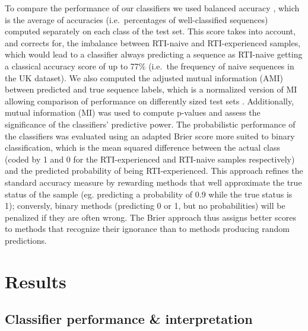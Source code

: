 \documentclass[
  11,
]{scrbook}
\begin{document}
To compare the performance of our classifiers we used balanced accuracy
\autocite{brodersenBalancedAccuracyIts2010}, which is the average of accuracies
(i.e.~percentages of well-classified sequences) computed separately on
each class of the test set. This score takes into account, and corrects
for, the imbalance between RTI-naive and RTI-experienced samples, which
would lead to a classifier always predicting a sequence as RTI-naive
getting a classical accuracy score of up to 77\% (i.e.~the frequency of
naive sequences in the UK dataset). We also computed the adjusted mutual
information (AMI) between predicted and true sequence labels, which is a
normalized version of MI allowing comparison of performance on
differently sized test sets \autocite{vinhInformationTheoreticMeasures2010}.
Additionally, mutual information (MI) was used to compute p-values and
assess the significance of the classifiers' predictive power. The
probabilistic performance of the classifiers was evaluated using an
adapted Brier score \autocite{brierVERIFICATIONFORECASTSEXPRESSED1950} more
suited to binary classification, which is the mean squared difference
between the actual class (coded by 1 and 0 for the RTI-experienced and
RTI-naive samples respectively) and the predicted probability of being
RTI-experienced. This approach refines the standard accuracy measure by
rewarding methods that well approximate the true status of the sample
(eg. predicting a probability of 0.9 while the true status is 1);
conversly, binary methods (predicting 0 or 1, but no probabilities) will
be penalized if they are often wrong. The Brier approach thus assigns
better scores to methods that recognize their ignorance than to methods
producing random predictions.

\hypertarget{results}{%
\section{Results}\label{results}}

\hypertarget{classifier-performance-interpretation}{%
\subsection{Classifier performance \& interpretation}\label{classifier-performance-interpretation}}
\end{document}
